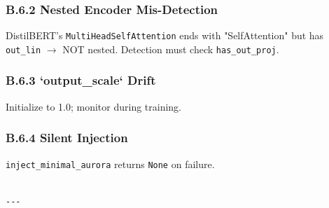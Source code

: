 \subsubsection{B.6.2 Nested Encoder Mis-Detection}

DistilBERT's \texttt{MultiHeadSelfAttention} ends with "SelfAttention" but has 
\texttt{out\_lin} $\to$ NOT nested. Detection must check \texttt{has\_out\_proj}.

\subsubsection{B.6.3 `output\_scale` Drift}

Initialize to 1.0; monitor during training.

\subsubsection{B.6.4 Silent Injection}

\texttt{inject\_minimal\_aurora} returns \texttt{None} on failure.
\begin{lstlisting}

---
\end{lstlisting}
